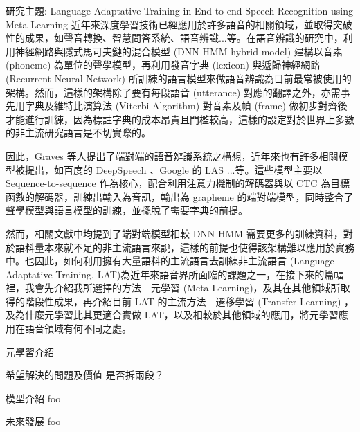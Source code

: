 \documentclass[12pt]{extarticle}
\begin{document}
\begin{section}{研究主題: Language Adaptative Training in End-to-end Speech Recognition using Meta Learning}
  近年來深度學習技術已經應用於許多語音的相關領域，並取得突破性的成果，如聲音轉換、智慧問答系統、語音辨識...等。在語音辨識的研究中，利用神經網路與隱式馬可夫鏈的混合模型 (DNN-HMM hybrid model) 建構以音素 (phoneme) 為單位的聲學模型，再利用發音字典 (lexicon) 與遞歸神經網路 (Recurrent Neural Network) 所訓練的語言模型來做語音辨識為目前最常被使用的架構。然而，這樣的架構除了要有每段語音 (utterance) 對應的翻譯之外，亦需事先用字典及維特比演算法 (Viterbi Algorithm) 對音素及幀 (frame) 做初步對齊後才能進行訓練，因為標註字典的成本昂貴且門檻較高，這樣的設定對於世界上多數的非主流研究語言是不切實際的。

  因此，Graves 等人提出了端對端的語音辨識系統之構想\cite{graves2014towards}，近年來也有許多相關模型被提出，如百度的 DeepSpeech \cite{hannun2014deep}、Google 的 LAS \cite{chan2016listen}...等。這些模型主要以 Sequence-to-sequence 作為核心，配合利用注意力機制的解碼器與以 CTC 為目標函數的解碼器，訓練出輸入為音訊，輸出為 grapheme 的端對端模型，同時整合了聲學模型與語言模型的訓練，並擺脫了需要字典的前提。

  然而，相關文獻中均提到了端對端模型相較 DNN-HMM 需要更多的訓練資料，對於語料量本來就不足的非主流語言來說，這樣的前提也使得該架構難以應用於實務中。也因此，如何利用擁有大量語料的主流語言去訓練非主流語言 (Language Adaptative Training, LAT)為近年來語音界所面臨的課題之一，在接下來的篇幅裡，我會先介紹我所選擇的方法 - 元學習 (Meta Learning)，及其在其他領域所取得的階段性成果，再介紹目前 LAT 的主流方法 - 遷移學習 (Transfer Learning) ，及為什麼元學習比其更適合實做 LAT，以及相較於其他領域的應用，將元學習應用在語音領域有何不同之處。


  \begin{subsection}{元學習介紹}
    \cite{finn2017model}
  \end{subsection}

  \begin{subsection}{希望解決的問題及價值}
    是否拆兩段？
  \end{subsection}


  \begin{subsection}{模型介紹}
    foo 
  \end{subsection}

\end{section}

\begin{section}{未來發展}
  foo
\end{section}



\end{document}
